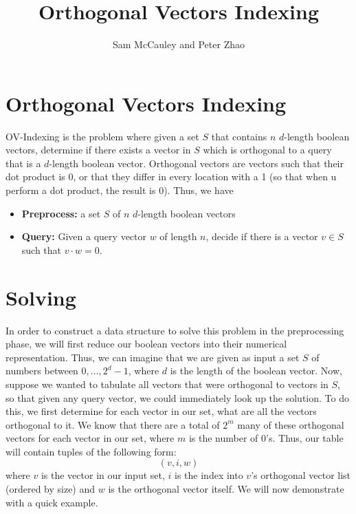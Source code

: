 \documentclass{article}
\title{Orthogonal Vectors Indexing}
\author{Sam McCauley and Peter Zhao}
\date{}
\begin{document}
\maketitle

\section{Orthogonal Vectors Indexing}
\label{sec:ovindexing}
OV-Indexing is the problem where given a set $S$ that contains $n$ $d$-length boolean vectors, determine if there exists a vector in $S$ which is orthogonal to a query that is a $d$-length boolean vector. Orthogonal vectors are vectors such that their dot product is 0, or that they differ in every location with a 1 (so that when u perform a dot product, the result is 0). Thus, we have
\begin{itemize}
    \item \textbf{Preprocess:} a set $S$ of $n$ $d$-length boolean vectors
    \item \textbf{Query:} Given a query vector $w$ of length $n$, decide if there is a vector $v \in S$ such that $v \cdot w = 0$.
\end{itemize}


\section{Solving}
\label{sec:solving}
In order to construct a data structure to solve this problem in the preprocessing phase, we will first reduce our boolean vectors into their numerical representation. Thus, we can imagine that we are given as input a set $S$ of numbers between $0,...,2^d-1$, where $d$ is the length of the boolean vector. Now, suppose we wanted to tabulate all vectors that were orthogonal to vectors in $S$, so that given any query vector, we could immediately look up the solution. To do this, we first determine for each vector in our set, what are all the vectors orthogonal to it. We know that there are a total of $2^m$ many of these orthogonal vectors for each vector in our set, where $m$ is the number of $0$'s. Thus, our table will contain tuples of the following form:
$$(v,i,w)$$
where $v$ is the vector in our input set, $i$ is the index into $v$'s orthogonal vector list (ordered by size) and $w$ is the orthogonal vector itself. We will now demonstrate with a quick example.
\end{document}
